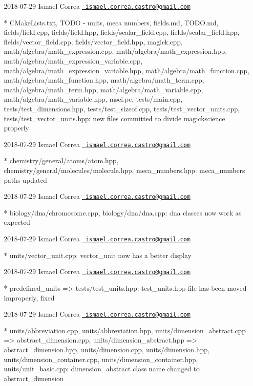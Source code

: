  2018-\/07-\/29 Ismael Correa \href{mailto:ismael.correa.castro@gmail.com}{\texttt{ ismael.\+correa.\+castro@gmail.\+com}} \begin{DoxyVerb}* CMakeLists.txt, TODO - units, meca numbers, fields.md, TODO.md,
fields/field.cpp, fields/field.hpp, fields/scalar_field.cpp,
fields/scalar_field.hpp, fields/vector_field.cpp,
fields/vector_field.hpp, magick.cpp,
math/algebra/math_expression.cpp, math/algebra/math_expression.hpp,
math/algebra/math_expression_variable.cpp,
math/algebra/math_expression_variable.hpp,
math/algebra/math_function.cpp, math/algebra/math_function.hpp,
math/algebra/math_term.cpp, math/algebra/math_term.hpp,
math/algebra/math_variable.cpp, math/algebra/math_variable.hpp,
msci.pc, tests/main.cpp, tests/test_dimensions.hpp,
tests/test_sizeof.cpp, tests/test_vector_units.cpp,
tests/test_vector_units.hpp: new files committed to divide
magickscience properly
\end{DoxyVerb}
 2018-\/07-\/29 Ismael Correa \href{mailto:ismael.correa.castro@gmail.com}{\texttt{ ismael.\+correa.\+castro@gmail.\+com}} \begin{DoxyVerb}* chemistry/general/atoms/atom.hpp,
chemistry/general/molecules/molecule.hpp, meca_numbers.hpp: 
meca_numbers paths updated
\end{DoxyVerb}
 2018-\/07-\/29 Ismael Correa \href{mailto:ismael.correa.castro@gmail.com}{\texttt{ ismael.\+correa.\+castro@gmail.\+com}} \begin{DoxyVerb}* biology/dna/chromosome.cpp, biology/dna/dna.cpp: dna classes now
work as expected
\end{DoxyVerb}
 2018-\/07-\/29 Ismael Correa \href{mailto:ismael.correa.castro@gmail.com}{\texttt{ ismael.\+correa.\+castro@gmail.\+com}} \begin{DoxyVerb}* units/vector_unit.cpp: vector_unit now has a better display
\end{DoxyVerb}
 2018-\/07-\/29 Ismael Correa \href{mailto:ismael.correa.castro@gmail.com}{\texttt{ ismael.\+correa.\+castro@gmail.\+com}} \begin{DoxyVerb}* {predefined_units => tests}/test_units.hpp: test_units.hpp file
has been moved improperly, fixed
\end{DoxyVerb}
 2018-\/07-\/29 Ismael Correa \href{mailto:ismael.correa.castro@gmail.com}{\texttt{ ismael.\+correa.\+castro@gmail.\+com}} \begin{DoxyVerb}* units/abbreviation.cpp, units/abbreviation.hpp,
units/{dimension_abstract.cpp => abstract_dimension.cpp},
units/{dimension_abstract.hpp => abstract_dimension.hpp},
units/dimension.cpp, units/dimension.hpp,
units/dimension_container.cpp, units/dimension_container.hpp,
units/unit_basic.cpp: dimension_abstract class name changed to
abstract_dimension
\end{DoxyVerb}
